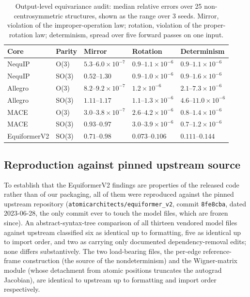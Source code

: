 \begin{table}[htbp]
\centering
\caption{Output-level equivariance audit: median relative errors over 25 non-centrosymmetric structures, shown as the range over 3 seeds. Mirror, violation of the improper-operation law; rotation, violation of the proper-rotation law; determinism, spread over five forward passes on one input.}
\label{stab:e5}
\scriptsize
\begin{tabular}{lllll}
\toprule
Core & Parity & Mirror & Rotation & Determinism \\
\midrule
NequIP & O(3) & $5.3$--$6.0\times10^{-7}$ & $0.9$--$1.1\times10^{-6}$ & $0.9$--$1.1\times10^{-6}$ \\
NequIP & SO(3) & $0.52$--$1.30$ & $0.9$--$1.0\times10^{-6}$ & $0.9$--$1.6\times10^{-6}$ \\
Allegro & O(3) & $8.2$--$9.2\times10^{-7}$ & $1.2\times10^{-6}$ & $2.1$--$7.3\times10^{-6}$ \\
Allegro & SO(3) & $1.11$--$1.17$ & $1.1$--$1.3\times10^{-6}$ & $4.6$--$11.0\times10^{-6}$ \\
MACE & O(3) & $3.0$--$3.8\times10^{-7}$ & $2.6$--$4.2\times10^{-6}$ & $0.8$--$1.4\times10^{-6}$ \\
MACE & SO(3) & $0.93$--$0.97$ & $3.0$--$3.9\times10^{-6}$ & $0.7$--$1.2\times10^{-6}$ \\
EquiformerV2 & SO(3) & $0.71$--$0.98$ & $0.073$--$0.106$ & $0.111$--$0.144$ \\
\bottomrule
\end{tabular}
\end{table}

\subsection*{Reproduction against pinned upstream source}

To establish that the EquiformerV2 findings are properties of the released code rather than of our packaging, all of them were reproduced against the pinned upstream repository (\texttt{atomicarchitects/equiformer\_v2}, commit \texttt{8fe8cba}, dated 2023-06-28, the only commit ever to touch the model files, which are frozen since). An abstract-syntax-tree comparison of all thirteen vendored model files against upstream classified six as identical up to formatting, five as identical up to import order, and two as carrying only documented dependency-removal edits; none differs substantively. The two load-bearing files, the per-edge reference-frame construction (the source of the nondeterminism) and the Wigner-matrix module (whose detachment from atomic positions truncates the autograd Jacobian), are identical to upstream up to formatting and import order respectively.

